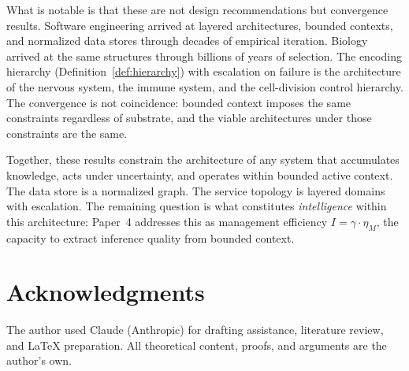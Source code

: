 \documentclass[11pt]{article}
\theoremstyle{definition}
\begin{document}
What is notable is that these are not design recommendations but
convergence results. Software engineering arrived at layered
architectures, bounded contexts, and normalized data stores through
decades of empirical iteration. Biology arrived at the same structures
through billions of years of selection. The encoding hierarchy
(Definition~\ref{def:hierarchy}) with escalation on failure is the
architecture of the nervous system, the immune system, and the
cell-division control hierarchy. The convergence is not coincidence:
bounded context imposes the same constraints regardless of substrate,
and the viable architectures under those constraints are the same.

Together, these results constrain the architecture of any system that
accumulates knowledge, acts under uncertainty, and operates within
bounded active context. The data store is a normalized graph. The
service topology is layered domains with escalation. The remaining
question is what constitutes \emph{intelligence} within this
architecture: Paper~4 \cite{McCarthy2026d} addresses this as
management efficiency $I = \gamma \cdot \eta_M$, the capacity to
extract inference quality from bounded context.

\section*{Acknowledgments}

The author used Claude (Anthropic) for drafting assistance, literature review, and \LaTeX{} preparation. All theoretical content, proofs, and arguments are the author's own.
\end{document}
